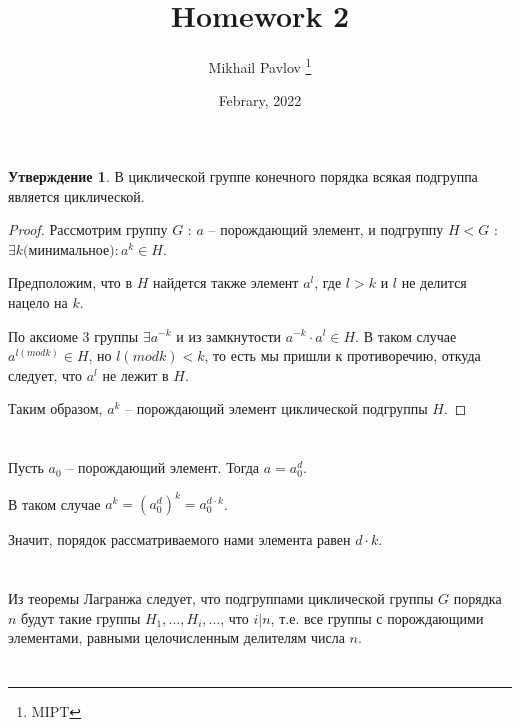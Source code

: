 \documentclass[12pt, a4paper]{article}
\title{Homework 2}
\author{Mikhail Pavlov \thanks{MIPT}}
\date{Febrary, 2022}
\theoremstyle{definition}
\newtheorem{st}[ex]{Утверждение}
\begin{document}
\section{}

\begin{st}
    В циклической группе конечного порядка всякая подгруппа является циклической.
\end{st}

\begin{proof}
   
    Рассмотрим группу $G$ : $a$ -- порождающий элемент, и подгруппу $H < G$ : $\exists k \text{(минимальное)} : a^k \in H$.
    
    Предположим, что в $H$ найдется также элемент $a^l$, где $l > k$ и $l$ не делится нацело на $k$.
    
    По аксиоме 3 группы $\exists a^{-k}$ и из замкнутости $a^{-k} \cdot a^{l} \in H$. В таком случае $a^{l (mod k)} \in H$, но $l (mod k) < k$, то есть мы пришли к противоречию, откуда следует, что $a^l$ не лежит в $H$.
    
    Таким образом, $a^k$ -- порождающий элемент циклической подгруппы $H$.

\end{proof}

\section{}

Пусть $a_0$ -- порождающий элемент. Тогда $a = a_0^d$.

В таком случае $a^k = (a_0^d)^k = a_0^{d \cdot k}$.

Значит, порядок рассматриваемого нами элемента равен \textbf{$d \cdot k$}.

\section{}

Из теоремы Лагранжа следует, что подгруппами циклической группы $G$ порядка $n$ будут такие группы $H_1, ..., H_i, ...$, что $i | n$, т.е. все группы с порождающими элементами, равными целочисленным делителям числа $n$. 
  

\section{}

\subsection{}
\end{document}
